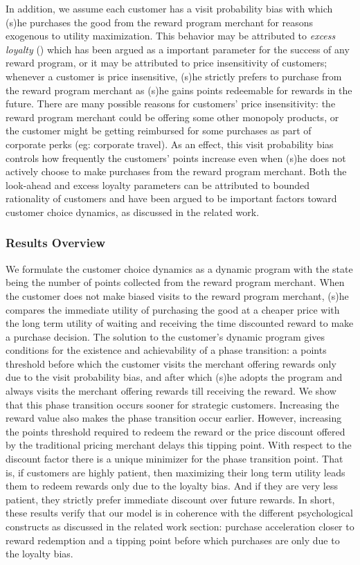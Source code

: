 In addition, we assume each customer has a visit probability bias with which (s)he purchases the good from the reward program merchant for reasons exogenous to utility maximization.
This behavior may be attributed to \emph{excess loyalty} (\cite{fader1993excess, sharp1997loyalty}) which has been argued as a important parameter for the success of any reward program, or it may be attributed to price insensitivity of customers; whenever a customer is price insensitive, (s)he strictly prefers to purchase from the reward program merchant as (s)he gains points redeemable for rewards in the future.
There are many possible reasons for customers' price insensitivity: the reward program merchant could be offering some other monopoly products, or the customer might be getting reimbursed for some purchases as part of corporate perks (eg: corporate travel).
As an effect, this visit probability bias controls how frequently the customers' points increase even when (s)he does not actively choose to make purchases from the reward program merchant.
Both the look-ahead and excess loyalty parameters can be attributed to bounded rationality of customers and have been argued to be important factors toward customer choice dynamics, as discussed in the related work.


\subsubsection{Results Overview}
We formulate the customer choice dynamics as a dynamic program with the state being the number of points collected from the reward program merchant.
When the customer does not make biased visits to the reward program merchant, (s)he compares the immediate utility of purchasing the good at a cheaper price with the long term utility of waiting and receiving the time discounted reward to make a purchase decision. 
The solution to the customer's dynamic program gives conditions for the existence and achievability of a phase transition: a points threshold before which the customer visits the merchant offering rewards only due to the visit probability bias, and after which (s)he adopts the program and always visits the merchant offering rewards till receiving the reward.
We show that this phase transition occurs sooner for strategic customers. Increasing the reward value also makes the phase transition occur earlier.
However, increasing the points threshold required to redeem the reward or the price discount offered by the traditional pricing merchant delays this tipping point.
With respect to the discount factor there is a unique minimizer for the phase transition point. That is, if customers are highly patient, then maximizing their long term utility leads them to redeem rewards only due to the loyalty bias.
And if they are very less patient, they strictly prefer immediate discount over future rewards.
In short, these results verify that our model is in coherence with the different psychological constructs as discussed in the related work section: purchase acceleration closer to reward redemption and a tipping point before which purchases are only due to the loyalty bias.


